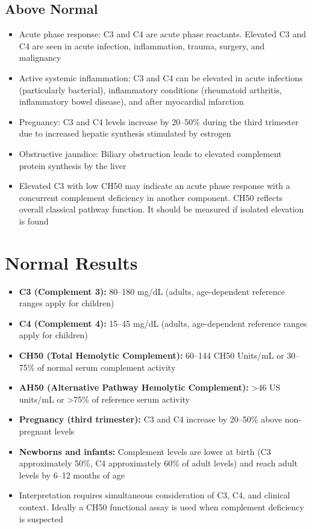 \subsection*{Above Normal}
\begin{itemize}
  \item Acute phase response: C3 and C4 are acute phase reactants. Elevated C3 and C4 are seen in acute infection, inflammation, trauma, surgery, and malignancy
  \item Active systemic inflammation: C3 and C4 can be elevated in acute infections (particularly bacterial), inflammatory conditions (rheumatoid arthritis, inflammatory bowel disease), and after myocardial infarction
  \item Pregnancy: C3 and C4 levels increase by 20--50\% during the third trimester due to increased hepatic synthesis stimulated by estrogen
  \item Obstructive jaundice: Biliary obstruction leads to elevated complement protein synthesis by the liver
  \item Elevated C3 with low CH50 may indicate an acute phase response with a concurrent complement deficiency in another component. CH50 reflects overall classical pathway function. It should be measured if isolated elevation is found
\end{itemize}

\section*{Normal Results}
\begin{itemize}
  \item \textbf{C3 (Complement 3):} 80--180 mg/dL (adults, age-dependent reference ranges apply for children)
  \item \textbf{C4 (Complement 4):} 15--45 mg/dL (adults, age-dependent reference ranges apply for children)
  \item \textbf{CH50 (Total Hemolytic Complement):} 60--144 CH50 Units/mL or 30--75\% of normal serum complement activity
  \item \textbf{AH50 (Alternative Pathway Hemolytic Complement):} >46 US units/mL or >75\% of reference serum activity
  \item \textbf{Pregnancy (third trimester):} C3 and C4 increase by 20--50\% above non-pregnant levels
  \item \textbf{Newborns and infants:} Complement levels are lower at birth (C3 approximately 50\%, C4 approximately 60\% of adult levels) and reach adult levels by 6--12 months of age
  \item Interpretation requires simultaneous consideration of C3, C4, and clinical context. Ideally a CH50 functional assay is used when complement deficiency is suspected
\end{itemize}

